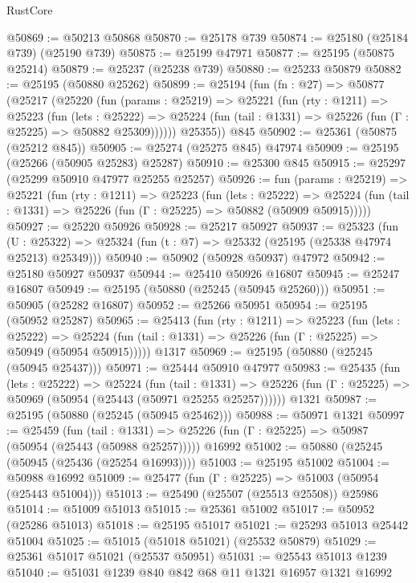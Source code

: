 \begin{lexlean}{RustCore}
\begin{coremodule}
@50869 := @50213 @50868
@50870 := @25178 @739
@50874 := @25180 (@25184 @739) (@25190 @739)
@50875 := @25199 @47971
@50877 := @25195 (@50875 @25214)
@50879 := @25237 (@25238 @739)
@50880 := @25233 @50879
@50882 := @25195 (@50880 @25262)
@50899 := @25194
    (fun (fn : @27) =>
    @50877
      (@25217
        (@25220
          (fun (params : @25219) =>
          @25221
            (fun (rty : @1211) =>
            @25223
              (fun (lets : @25222) =>
              @25224 (fun (tail : @1331) => @25226 (fun (Γ : @25225) => @50882 @25309))))))
        @25355))
    @845
@50902 := @25361 (@50875 (@25212 @845))
@50905 := @25274 (@25275 @845) @47974
@50909 := @25195 (@25266 (@50905 @25283) @25287)
@50910 := @25300 @845
@50915 := @25297 (@25299 @50910 @47977 @25255 @25257)
@50926 := fun (params : @25219) =>
  @25221
    (fun (rty : @1211) =>
    @25223
      (fun (lets : @25222) =>
      @25224 (fun (tail : @1331) => @25226 (fun (Γ : @25225) => @50882 (@50909 @50915)))))
@50927 := @25220 @50926
@50928 := @25217 @50927
@50937 := @25323
    (fun (U : @25322) => @25324 (fun (t : @7) => @25332 (@25195 (@25338 @47974 @25213) @25349)))
@50940 := @50902 (@50928 @50937) @47972
@50942 := @25180 @50927 @50937
@50944 := @25410 @50926 @16807
@50945 := @25247 @16807
@50949 := @25195 (@50880 (@25245 (@50945 @25260)))
@50951 := @50905 (@25282 @16807)
@50952 := @25266 @50951
@50954 := @25195 (@50952 @25287)
@50965 := @25413
    (fun (rty : @1211) =>
    @25223
      (fun (lets : @25222) =>
      @25224 (fun (tail : @1331) => @25226 (fun (Γ : @25225) => @50949 (@50954 @50915)))))
    @1317
@50969 := @25195 (@50880 (@25245 (@50945 @25437)))
@50971 := @25444 @50910 @47977
@50983 := @25435
    (fun (lets : @25222) =>
    @25224
      (fun (tail : @1331) =>
      @25226 (fun (Γ : @25225) => @50969 (@50954 (@25443 (@50971 @25255 @25257))))))
    @1321
@50987 := @25195 (@50880 (@25245 (@50945 @25462)))
@50988 := @50971 @1321
@50997 := @25459
    (fun (tail : @1331) => @25226 (fun (Γ : @25225) => @50987 (@50954 (@25443 (@50988 @25257)))))
    @16992
@51002 := @50880 (@25245 (@50945 (@25436 (@25254 @16993))))
@51003 := @25195 @51002
@51004 := @50988 @16992
@51009 := @25477 (fun (Γ : @25225) => @51003 (@50954 (@25443 @51004)))
@51013 := @25490 (@25507 (@25513 @25508)) @25986
@51014 := @51009 @51013
@51015 := @25361 @51002
@51017 := @50952 (@25286 @51013)
@51018 := @25195 @51017
@51021 := @25293 @51013 @25442 @51004
@51025 := @51015 (@51018 @51021) (@25532 @50879)
@51029 := @25361 @51017 @51021 (@25537 @50951)
@51031 := @25543 @51013 @1239
@51040 := @51031 @1239 @840 @842 @68 @11 @1321 @16957 @1321 @16992

\end{coremodule}
\end{lexlean}
